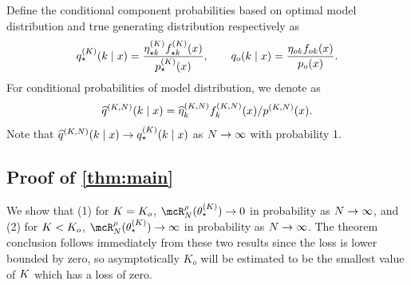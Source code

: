 Define the conditional component probabilities based on optimal model distribution and true generating distribution respectively as
\[
	q^{(K)}_{\star}(k \mid x)= \frac{\eta^{(K)}_{\star k}
  f_{\star k}^{(K)}(x)}{p^{(K)}_{\star}(x)}, \qquad
	q_{o}(k \mid x) = \frac{\eta_{ok}f_{ok}(x)}{p_{o}(x)}.
\]
For conditional probabilities of model distribution, we denote as 
\[
\widehat{q}^{(K, N)}(k \mid x) = \widehat{\eta}^{(K,N)}_{k}f_{k}^{(K,N)}(x) / p^{(K,N)}(x).
\]
Note that $\widehat{q}^{(K,N)} (k\mid x) \rightarrow q^{(K)}_{\star}(k \mid x)$ as $N \rightarrow \infty$ with probability 1.


\subsection{Proof of \cref{thm:main}} \label{pf:main-thm}

We show that (1) for $K = K_o$,  $ \mcR^{\rho}_{\numobs}(\allparam^{(\numcomps)}_{\star}) \rightarrow 0$ in probability as $N \rightarrow \infty$, and (2) for $K < K_o$, $\mcR^{\rho}_{\numobs}(\allparam^{(\numcomps)}_{\star})\rightarrow \infty$ in probability as $N \rightarrow \infty$.
The theorem conclusion follows immediately from these two results since the loss is lower bounded by zero,
so asymptotically $K_o$ will be estimated to be the smallest value of $K$ which has a loss of zero.

